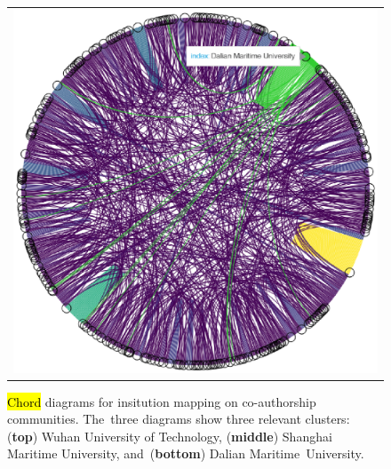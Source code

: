 \documentclass[jmse,review,accept,pdftex,moreauthors]{Definitions/mdpi}
\begin{document}
\begin{figure}[H]
\begin{tabular}{l}
	\includegraphics[height=0.3\textheight, keepaspectratio]{pics/coauthorship_inst_chord_3.eps}\\
	\end{tabular}
	\caption{\hl{Chord} %
 diagrams for insitution mapping on co-authorship communities. The~three diagrams show three relevant clusters: (\textbf{top}) Wuhan University of Technology, (\textbf{middle}) Shanghai Maritime University, and~(\textbf{bottom}) Dalian Maritime~University.}\label{fig:fig6}
\end{figure}
\unskip
\end{document}
